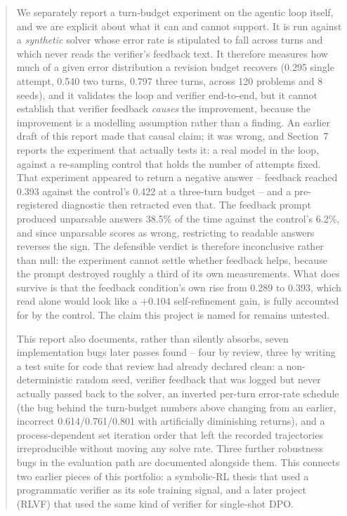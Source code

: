 \documentclass[11pt]{article}
\begin{document}
\begin{abstract}
We separately report a turn-budget experiment on the agentic loop itself,
and we are explicit about what it can and cannot support. It is run against
a \emph{synthetic} solver whose error rate is stipulated to fall across
turns and which never reads the verifier's feedback text. It therefore
measures how much of a given error distribution a revision budget recovers
(0.295 single attempt, 0.540 two turns, 0.797 three turns, across 120
problems and 8 seeds), and it validates the loop and verifier end-to-end,
but it cannot establish that verifier feedback \emph{causes} the
improvement, because the improvement is a modelling assumption rather than
a finding. An earlier draft of this report made that causal claim; it was
wrong, and Section~7 reports the experiment that actually tests it: a real
model in the loop, against a re-sampling control that holds the number of
attempts fixed. That experiment appeared to return a negative answer --
feedback reached 0.393 against the control's 0.422 at a three-turn budget --
and a pre-registered diagnostic then retracted even that. The feedback
prompt produced unparsable answers 38.5\% of the time against the control's
6.2\%, and since unparsable scores as wrong, restricting to readable answers
reverses the sign. The defensible verdict is therefore inconclusive rather
than null: the experiment cannot settle whether feedback helps, because the
prompt destroyed roughly a third of its own measurements. What does survive
is that the feedback condition's own rise from 0.289 to 0.393, which read
alone would look like a $+0.104$ self-refinement gain, is fully accounted
for by the control. The claim this project is named for remains untested.

This report also documents, rather than silently absorbs, seven
implementation bugs later passes found -- four by review, three by writing a
test suite for code that review had already declared clean: a non-deterministic random
seed, verifier feedback that was logged but never actually passed back to
the solver, an inverted per-turn error-rate schedule (the bug behind the
turn-budget numbers above changing from an earlier, incorrect
0.614/0.761/0.801 with artificially diminishing returns), and a
process-dependent set iteration order that left the recorded trajectories
irreproducible without moving any solve rate. Three further robustness bugs
in the evaluation path are documented alongside them. This connects two
earlier pieces of this portfolio: a symbolic-RL thesis that used a
programmatic verifier as its sole training signal, and a later project
(RLVF) that used the same kind of verifier for single-shot DPO.
\end{abstract}
\end{document}
